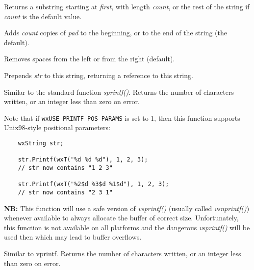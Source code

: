 Returns a substring starting at {\it first}, with length {\it count}, or the rest of
the string if {\it count} is the default value.


\label{wxstringpad}


Adds {\it count} copies of {\it pad} to the beginning, or to the end of the string (the default).

Removes spaces from the left or from the right (default).


\label{wxstringprepend}


Prepends {\it str} to this string, returning a reference to this string.


\label{wxstringprintf}


Similar to the standard function {\it sprintf()}. Returns the number of
characters written, or an integer less than zero on error.

Note that if {\tt wxUSE\_PRINTF\_POS\_PARAMS} is set to 1, then this function supports
Unix98-style positional parameters:

\begin{verbatim}
    wxString str;

    str.Printf(wxT("%d %d %d"), 1, 2, 3);
    // str now contains "1 2 3"

    str.Printf(wxT("%2$d %3$d %1$d"), 1, 2, 3);
    // str now contains "2 3 1"
\end{verbatim}

{\bf NB:} This function will use a safe version of {\it vsprintf()} (usually called 
{\it vsnprintf()}) whenever available to always allocate the buffer of correct
size. Unfortunately, this function is not available on all platforms and the
dangerous {\it vsprintf()} will be used then which may lead to buffer overflows.


\label{wxstringprintfv}


Similar to vprintf. Returns the number of characters written, or an integer less than zero
on error.


